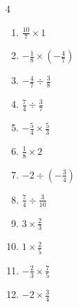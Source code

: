 \begin{multicols}{4}
\begin{enumerate}
\columnbreak %

  \item $\displaystyle \frac{10}{7}\times{}1$


  \item $\displaystyle -\frac{1}{8}\times{}\left(-\frac{4}{7}\right)$


  \item $\displaystyle -\frac{4}{7}\div{}\frac{3}{8}$


  \item $\displaystyle \frac{7}{4}\div{}\frac{3}{7}$


  \item $\displaystyle -\frac{5}{4}\times{}\frac{5}{3}$


  \item $\displaystyle \frac{1}{8}\times{}2$


  \item $\displaystyle -2\div{}\left(-\frac{3}{4}\right)$


  \item $\displaystyle \frac{7}{4}\div{}\frac{3}{10}$


  \item $\displaystyle 3\times{}\frac{2}{3}$

        \phantom{$\displaystyle =2$}

  \item $\displaystyle 1\times{}\frac{2}{5}$


\columnbreak %

  \item $\displaystyle -\frac{2}{3}\times{}\frac{7}{5}$


  \item $\displaystyle -2\times{}\frac{3}{4}$


\end{enumerate}
\end{multicols}
